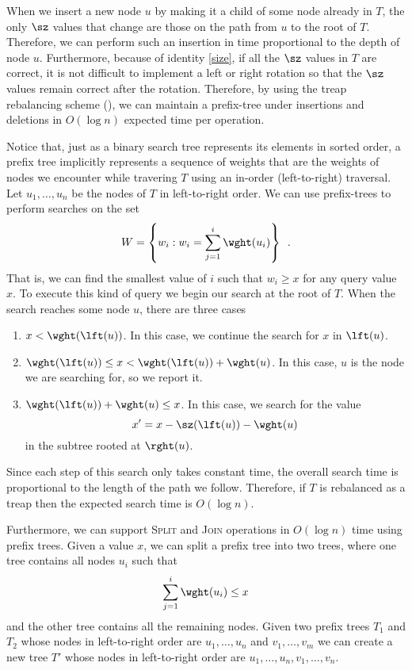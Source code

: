 When we insert a new node $u$ by making it a child of some node
already in $T$, the only $\sz$ values that change are those on the
path from $u$ to the root of $T$.  Therefore, we can perform such an
insertion in time proportional to the depth of node $u$.  Furthermore,
because of identity \eqref{size}, if all the $\sz$ values in $T$ are
correct, it is not difficult to implement a left or right rotation so
that the $\sz$ values remain correct after the rotation.  Therefore, by
using the treap rebalancing scheme (), we can maintain
a prefix-tree under insertions and deletions in $O(\log n)$ expected
time per operation.

Notice that, just as a binary search tree represents its elements in
sorted order, a prefix tree implicitly represents a sequence of
weights that are the weights of nodes we encounter while travering $T$
using an in-order (left-to-right) traversal.  Let $u_1,\ldots,u_n$ be
the nodes of $T$ in left-to-right order.  We can use prefix-trees to
perform searches on the set
\[
W = \left\{ w_i : w_i = \sum_{j=1}^i \wght(u_i) \right\} \enspace .
\]
That is, we can find the smallest value of $i$ such that $w_i\ge x$
for any query value $x$.  To execute this kind of query we begin our
search at the root of $T$.  When the search reaches some node $u$,
there are three cases

\begin{enumerate}
\item $x < \wght(\lft(u))$.  In this case, we continue the search for $x$ in
  $\lft(u)$.

\item $\wght(\lft(u)) \le x < \wght(\lft(u)) + \wght(u)$.  In this
  case, $u$ is the node we are searching for, so we report it.

\item $\wght(\lft(u)) + \wght(u) \le x$.  In this case, we search
  for the value
  \[ x'=x - \sz(\lft(u)) - \wght(u) \]
  in the subtree rooted at $\rght(u)$.
\end{enumerate}

Since each step of this search only takes constant time, the overall
search time is proportional to the length of the path we follow.
Therefore, if $T$ is rebalanced as a treap then the expected search
time is $O(\log n)$.

Furthermore, we can support \textsc{Split} and \textsc{Join}
operations in $O(\log n)$ time using prefix trees.  Given a value $x$,
we can split a prefix tree into two trees, where one tree contains all nodes
$u_i$ such that
\[ \sum_{j=1}^i\wght(u_i) \le x
\]
 and the other tree contains all the remaining nodes.  Given two
prefix trees $T_1$ and $T_2$ whose nodes in left-to-right order are
$u_1,\ldots,u_n$ and $v_1,\ldots,v_m$ we can create a new tree $T'$
whose nodes in left-to-right order are
$u_1,\ldots,u_n,v_1,\ldots,v_n$.


